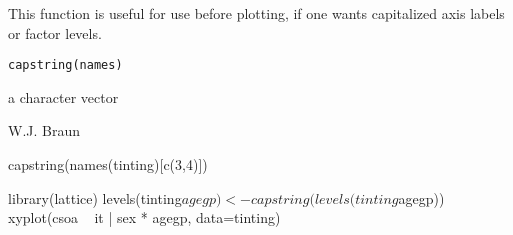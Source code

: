 \begin{Description}\relax
This function is useful for use before
plotting, if one wants capitalized axis labels or factor
levels.
\end{Description}
\begin{Usage}
\begin{verbatim}
capstring(names)

\end{verbatim}
\end{Usage}
\begin{Arguments}
\begin{ldescription}
\item[\code{names}] a character vector
\end{ldescription}
\end{Arguments}
\begin{Value}
\begin{ldescription}
\item[\code{a character vector with upper case initial values}] 
\end{ldescription}
\end{Value}
\begin{Author}\relax
W.J. Braun
\end{Author}
\begin{Examples}
\begin{ExampleCode}
capstring(names(tinting)[c(3,4)])

library(lattice)
levels(tinting$agegp) <- capstring(levels(tinting$agegp))
xyplot(csoa ~ it | sex * agegp, data=tinting) 
\end{ExampleCode}
\end{Examples}

